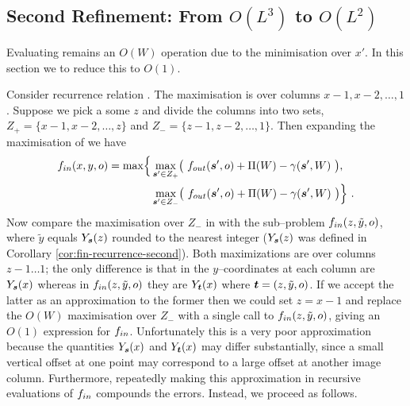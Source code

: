 \subsection{Second Refinement: From $O(L^3)$ to $O(L^2)$}
\label{sec:line-jump}
Evaluating  remains an $O(W)$ operation
due to the minimisation over $x'$. In this section we to reduce this
to $O(1)$.

Consider recurrence relation . The
maximisation is over columns $x-1,x-2,\ldots,1$. Suppose we pick a
some $z$ and divide the columns into two sets,
$Z_+=\{x-1,x-2,\ldots,z\}$ and $Z_-=\{z-1,z-2,\ldots,1\}$. Then
expanding the maximisation of  we have
\begin{equation}
  \label{eq:fin-split}
  \begin{split}
    \SubProbIN(x,y,\WallOrient) =
    \max\Bigl\{
      &\max_{\State'\in Z_+}\limits \bigl(~
        \SubProbOUT(\State',\WallOrient)
        + \WallPayoff(\Wall) - \CornerPenalty(\State',\Wall)~
      \bigr),\\
      &\max_{\State'\in Z_-}\limits \bigl(~
        \SubProbOUT(\State',\WallOrient)
        + \WallPayoff(\Wall) - \CornerPenalty(\State',\Wall)~
      \bigr)
    \Bigr\} ~.
  \end{split}
\end{equation}
Now compare the maximisation over $Z_-$ in  with the
sub--problem $\SubProbIN(z,\tilde{y},o)$, where $\tilde{y}$ equals
$Y_{\State}(z)$ rounded to the nearest integer ($Y_{\State}(z)$ was
defined in Corollary \ref{cor:fin-recurrence-second}). Both
maximizations are over columns $z-1 \ldots 1$; the only difference is
that in  the $y$--coordinates at each column are
$Y_{\State}(x)$ whereas in $\SubProbIN(z,\tilde{y},o)$ they are
$Y_{\OtherState}(x)$ where $\OtherState=(z,\tilde{y},o)$. If we accept
the latter as an approximation to the former then we could set $z=x-1$
and replace the $O(W)$ maximisation over $Z_-$ with a single call to
$\SubProbIN(z,\tilde{y},\WallOrient)$, giving an $O(1)$ expression for
$\SubProbIN$. Unfortunately this is a very poor approximation because
the quantities $Y_{\State}(x)$ and $Y_{\OtherState}(x)$ may differ
substantially, since a small vertical offset at one point may
correspond to a large offset at another image column. Furthermore,
repeatedly making this approximation in recursive evaluations of
$\SubProbIN$ compounds the errors. Instead, we proceed as follows.

